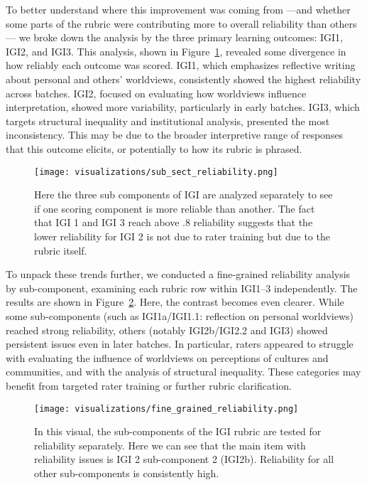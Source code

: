 \documentclass[12pt]{article}%
\begin{document}
To better understand where this improvement was coming from —and whether some parts of the rubric were contributing more to overall reliability than others— we broke down the analysis by the three primary learning outcomes: IGI1, IGI2, and IGI3. This analysis, shown in Figure~\ref{fig:sub_sect_reliability}, revealed some divergence in how reliably each outcome was scored. IGI1, which emphasizes reflective writing about personal and others’ worldviews, consistently showed the highest reliability across batches. IGI2, focused on evaluating how worldviews influence interpretation, showed more variability, particularly in early batches. IGI3, which targets structural inequality and institutional analysis, presented the most inconsistency. This may be due to the broader interpretive range of responses that this outcome elicits, or potentially to how its rubric is phrased.

\begin{figure}[h]
    \centering
    \texttt{[image: visualizations/sub\_sect\_reliability.png]}
    \caption{Here the three sub components of IGI are analyzed separately to see if one scoring component is more reliable than another. The fact that IGI 1 and IGI 3 reach above .8 reliability suggests that the lower reliability for IGI 2 is not due to rater training but due to the rubric itself.}
    \label{fig:sub_sect_reliability}
\end{figure}

To unpack these trends further, we conducted a fine-grained reliability analysis by sub-component, examining each rubric row within IGI1–3 independently. The results are shown in Figure~\ref{fig:fine_grained_reliability}. Here, the contrast becomes even clearer. While some sub-components (such as IGI1a/IGI1.1: reflection on personal worldviews) reached strong reliability, others (notably IGI2b/IGI2.2 and IGI3) showed persistent issues even in later batches. In particular, raters appeared to struggle with evaluating the influence of worldviews on perceptions of cultures and communities, and with the analysis of structural inequality. These categories may benefit from targeted rater training or further rubric clarification.

\begin{figure}[h]
    \centering
    \texttt{[image: visualizations/fine\_grained\_reliability.png]}
    \caption{In this visual, the sub-components of the IGI rubric are tested for reliability separately. Here we can see that the main item with reliability issues is IGI 2 sub-component 2 (IGI2b). Reliability for all other sub-components is consistently high.}
    \label{fig:fine_grained_reliability}
\end{figure}
\end{document}
